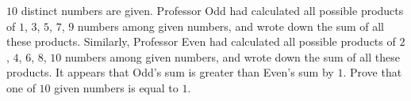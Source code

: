 $10$ distinct numbers are given. Professor Odd had calculated all possible products of $1$, $3$, $5$, $7$, $9$ numbers among given numbers, and wrote down the sum of all these products. Similarly, Professor Even had calculated all possible products of $2$, $4$, $6$, $8$, $10$ numbers among given numbers, and wrote down the sum of all these products. It appears that Odd's sum is greater than Even's sum by $1$. Prove that one of $10$ given numbers is equal to $1$.